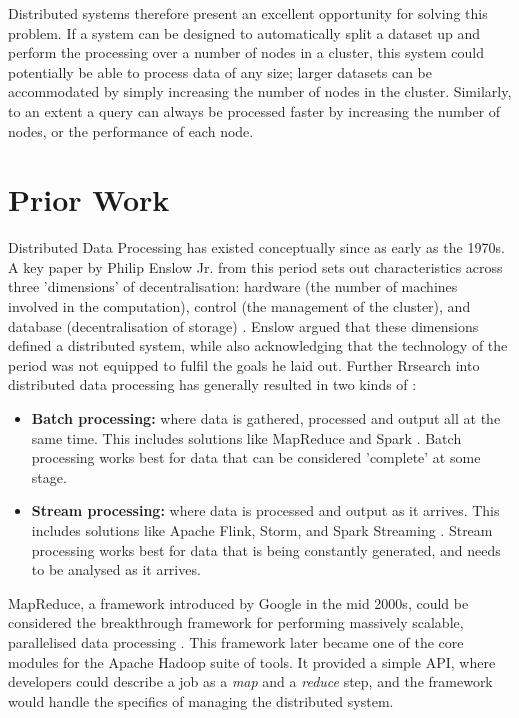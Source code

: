 Distributed systems therefore present an excellent opportunity for solving this problem. If a system can be designed to automatically split a dataset up and perform the processing over a number of nodes in a cluster, this system could potentially be able to process data of any size; larger datasets can be accommodated by simply increasing the number of nodes in the cluster. Similarly, to an extent a query can always be processed faster by increasing the number of nodes, or the performance of each node.


\section{Prior Work}
Distributed Data Processing has existed conceptually since as early as the 1970s. A key paper by Philip Enslow Jr{\frenchspacing.} from this period sets out characteristics across three 'dimensions' of decentralisation: hardware (the number of machines involved in the computation), control (the management of the cluster), and database (decentralisation of storage) \cite{enslow1978distributed}. Enslow argued that these dimensions defined a distributed system, while also acknowledging that the technology of the period was not equipped to fulfil the goals he laid out. Further Rrsearch into distributed data processing has generally resulted in two kinds of  \cite{yaqoob2016big}:
\begin{itemize}
	\item \textbf{Batch processing:} where data is gathered, processed and output all at the same time. This includes solutions like MapReduce and Spark  \cite{dean2008mapreduce, zaharia2016spark}. Batch processing works best for data that can be considered 'complete' at some stage.
	\item \textbf{Stream processing:} where data is processed and output as it arrives. This includes solutions like Apache Flink, Storm, and Spark Streaming \cite{carbone2015flink, toshniwal2014storm, armbrust2018sparkstreaming}. Stream processing works best for data that is being constantly generated, and needs to be analysed as it arrives.
\end{itemize}

MapReduce, a framework introduced by Google in the mid 2000s, could be considered the breakthrough framework for performing massively scalable, parallelised data processing \cite{dean2008mapreduce}. This framework later became one of the core modules for the Apache Hadoop suite of tools. It provided a simple API, where developers could describe a job as a \textit{map} and a \textit{reduce} step, and the framework would handle the specifics of managing the distributed system. 

